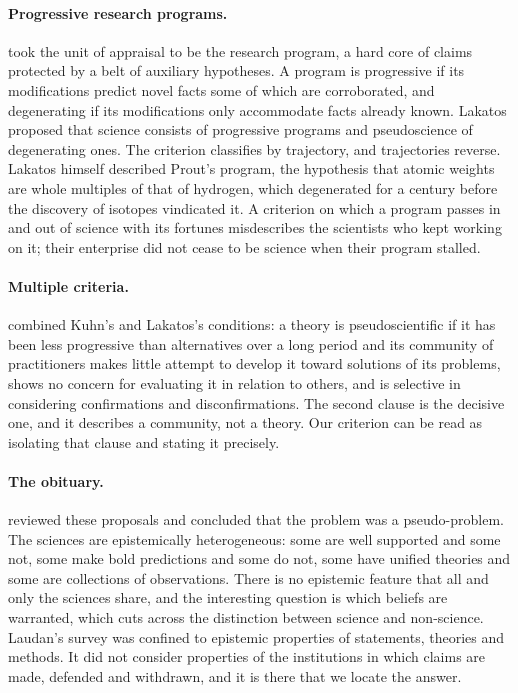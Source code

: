 \documentclass{situationist-preprint}
\begin{document}
\paragraph{Progressive research programs.} \citet{Lakatos1970} took the unit of appraisal to be the research program, a hard core of claims protected by a belt of auxiliary hypotheses. A program is progressive if its modifications predict novel facts some of which are corroborated, and degenerating if its modifications only accommodate facts already known. Lakatos proposed that science consists of progressive programs and pseudoscience of degenerating ones. The criterion classifies by trajectory, and trajectories reverse. Lakatos himself described Prout's program, the hypothesis that atomic weights are whole multiples of that of hydrogen, which degenerated for a century before the discovery of isotopes vindicated it. A criterion on which a program passes in and out of science with its fortunes misdescribes the scientists who kept working on it; their enterprise did not cease to be science when their program stalled.

\paragraph{Multiple criteria.} \citet{Thagard1978} combined Kuhn's and Lakatos's conditions: a theory is pseudoscientific if it has been less progressive than alternatives over a long period and its community of practitioners makes little attempt to develop it toward solutions of its problems, shows no concern for evaluating it in relation to others, and is selective in considering confirmations and disconfirmations. The second clause is the decisive one, and it describes a community, not a theory. Our criterion can be read as isolating that clause and stating it precisely.

\paragraph{The obituary.} \citet{Laudan1983} reviewed these proposals and concluded that the problem was a pseudo-problem. The sciences are epistemically heterogeneous: some are well supported and some not, some make bold predictions and some do not, some have unified theories and some are collections of observations. There is no epistemic feature that all and only the sciences share, and the interesting question is which beliefs are warranted, which cuts across the distinction between science and non-science. Laudan's survey was confined to epistemic properties of statements, theories and methods. It did not consider properties of the institutions in which claims are made, defended and withdrawn, and it is there that we locate the answer.
\end{document}
